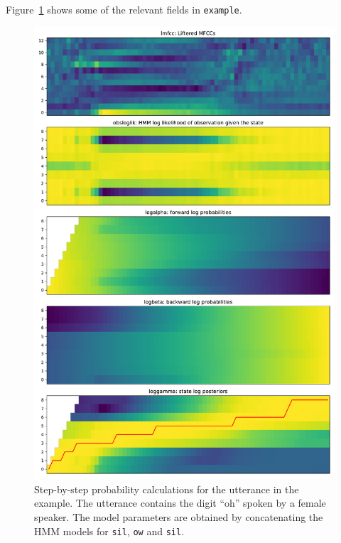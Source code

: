 \documentclass{nada-ten}
\begin{document}
Figure~\ref{fig:example} shows some of the relevant fields in \texttt{example}.

\begin{figure}
  \centering
  \includegraphics[height=0.9\textheight]{Probabilities_step_by_step}
  \caption{Step-by-step probability calculations for the utterance in the example. The utterance contains the digit ``oh'' spoken by a female speaker. The model parameters are obtained by concatenating the HMM models for \texttt{sil}, \texttt{ow} and \texttt{sil}.}
  \label{fig:example}
\end{figure}
\end{document}
